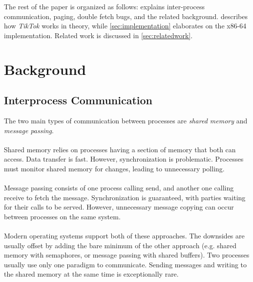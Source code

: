 The rest of the paper is organized as follows:  explains 
inter-process communication, paging, double fetch bugs, and the related
background.  describes how \emph{TikTok} works in theory, while
\cref{sec:implementation} elaborates on the x86-64 implementation. Related work
is discussed in \cref{sec:relatedwork}.

\section{Background}

\label{sec:background}
\subsection{Interprocess Communication}

The two main types of communication between processes are \emph{shared memory} 
and \emph{message passing}\cite{silberschatz2018operating}.
\\
\\
Shared memory relies on processes having a section of memory that both can 
access. Data transfer is fast. However, synchronization is problematic. 
Processes must monitor shared memory for changes, leading to unnecessary
polling.
\\
\\
Message passing consists of one process calling send, and another one calling
receive to fetch the message. Synchronization is guaranteed, with parties
waiting for their calls to be served. However, unnecessary message copying can
occur between processes on the same system.
\\
\\
Modern operating systems support both of these approaches. The downsides are
usually offset by adding the  bare minimum of the other approach (e.g. shared
memory with semaphores, or message passing with shared buffers). Two processes
usually use only one paradigm to communicate. Sending messages and writing
to the shared memory at the same time is exceptionally rare.

